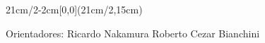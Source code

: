 


\begin{textblock*}{21cm/2-2cm}[0,0](21cm/2,15cm)
  \begin{flushleft}
    

    {\large
      Orientadores:\newline
      Ricardo Nakamura\newline
      Roberto Cezar Bianchini
    }
  \end{flushleft}
\end{textblock*}

